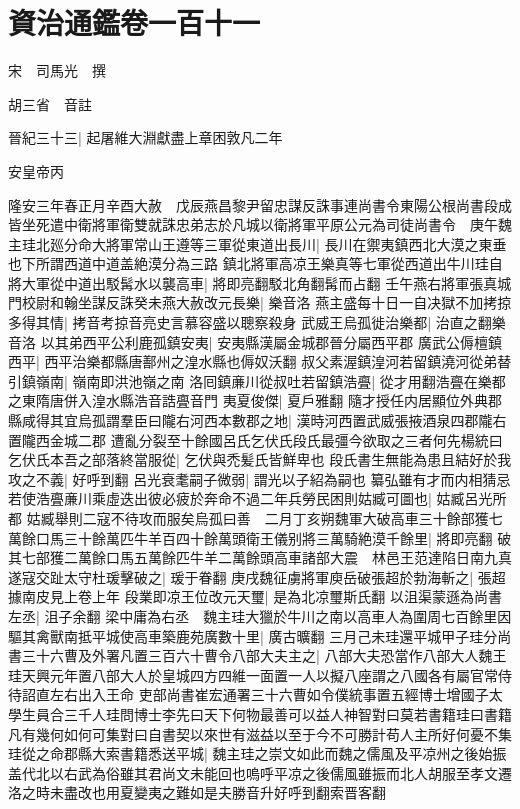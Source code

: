 \chapter{資治通鑑卷一百十一}


宋　司馬光　撰

胡三省　音註

晉紀三十三|{
	起屠維大淵獻盡上章困敦凡二年}


安皇帝丙

隆安三年春正月辛酉大赦　戊辰燕昌黎尹留忠謀反誅事連尚書令東陽公根尚書段成皆坐死遣中衛將軍衛雙就誅忠弟志於凡城以衛將軍平原公元為司徒尚書令　庚午魏主珪北廵分命大將軍常山王遵等三軍從東道出長川|{
	長川在禦夷鎮西北大漠之東垂也下所謂西道中道盖絶漠分為三路}
鎮北將軍高凉王樂真等七軍從西道出牛川珪自將大軍從中道出駁髯水以襲高車|{
	將即亮翻駁北角翻髯而占翻}
壬午燕右將軍張真城門校尉和翰坐謀反誅癸未燕大赦改元長樂|{
	樂音洛}
燕主盛每十日一自决獄不加拷掠多得其情|{
	拷音考掠音亮史言慕容盛以聰察殺身}
武威王烏孤徙治樂都|{
	治直之翻樂音洛}
以其弟西平公利鹿孤鎮安夷|{
	安夷縣漢屬金城郡晉分屬西平郡}
廣武公傉檀鎮西平|{
	西平治樂都縣唐鄯州之湟水縣也傉奴沃翻}
叔父素渥鎮湟河若留鎮澆河從弟替引鎮嶺南|{
	嶺南即洪池嶺之南}
洛囘鎮亷川從叔吐若留鎮浩亹|{
	從才用翻浩亹在樂都之東隋唐併入湟水縣浩音誥亹音門}
夷夏俊傑|{
	夏戶雅翻}
隨才授任内居顯位外典郡縣咸得其宜烏孤謂羣臣曰隴右河西本數郡之地|{
	漢時河西置武威張掖酒泉四郡隴右置隴西金城二郡}
遭亂分裂至十餘國呂氏乞伏氏段氏最彊今欲取之三者何先楊統曰乞伏氏本吾之部落終當服從|{
	乞伏與禿髪氏皆鮮卑也}
段氏書生無能為患且結好於我攻之不義|{
	好呼到翻}
呂光衰耄嗣子微弱|{
	謂光以子紹為嗣也}
纂弘雖有才而内相猜忌若使浩亹亷川乘虛迭出彼必疲於奔命不過二年兵勞民困則姑臧可圖也|{
	姑臧呂光所都}
姑臧舉則二寇不待攻而服矣烏孤曰善　二月丁亥朔魏軍大破高車三十餘部獲七萬餘口馬三十餘萬匹牛羊百四十餘萬頭衛王儀别將三萬騎絶漠千餘里|{
	將即亮翻}
破其七部獲二萬餘口馬五萬餘匹牛羊二萬餘頭高車諸部大震　林邑王范達陷日南九真遂寇交趾太守杜瑗擊破之|{
	瑗于眷翻}
庚戌魏征虜將軍庾岳破張超於勃海斬之|{
	張超據南皮見上卷上年}
段業即凉王位改元天璽|{
	是為北凉璽斯氏翻}
以沮渠蒙遜為尚書左丞|{
	沮子余翻}
梁中庸為右丞　魏主珪大獵於牛川之南以高車人為圍周七百餘里因驅其禽獸南抵平城使高車築鹿苑廣數十里|{
	廣古曠翻}
三月己未珪還平城甲子珪分尚書三十六曹及外署凡置三百六十曹令八部大夫主之|{
	八部大夫恐當作八部大人魏王珪天興元年置八部大人於皇城四方四維一面置一人以擬八座謂之八國各有屬官常侍待詔直左右出入王命}
吏部尚書崔宏通署三十六曹如令僕統事置五經博士增國子太學生員合三千人珪問博士李先曰天下何物最善可以益人神智對曰莫若書籍珪曰書籍凡有幾何如何可集對曰自書契以來世有滋益以至于今不可勝計苟人主所好何憂不集珪從之命郡縣大索書籍悉送平城|{
	魏主珪之崇文如此而魏之儒風及平凉州之後始振盖代北以右武為俗雖其君尚文未能回也嗚呼平凉之後儒風雖振而北人胡服至孝文遷洛之時未盡改也用夏變夷之難如是夫勝音升好呼到翻索晋客翻}
